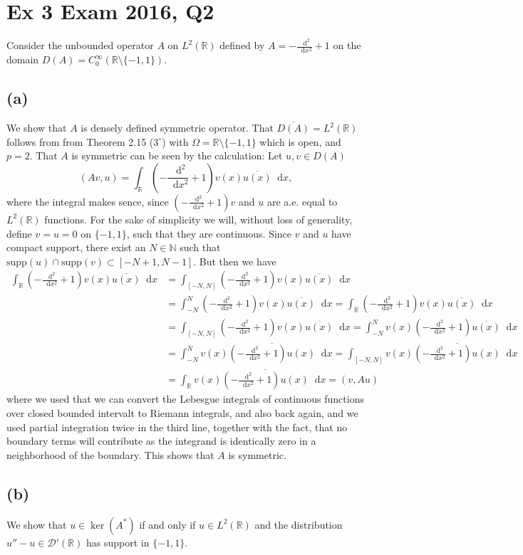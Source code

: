\documentclass[a4paper,11pt]{article}
\newcommand{\supp}{\text{supp}}
\newcommand*\diff{\mathop{}\!\mathrm{d}}
\newcommand{\R}{\mathbb{R}}
\newcommand{\N}{\mathbb{N}}
\numberwithin{equation}{section}
\begin{document}
\section*{Ex 3 Exam 2016, Q2}
Consider the unbounded operator $ A $ on $ L^2(\R) $ defined by $ A=-\frac{\diff^2}{\diff x^2}+1 $ on the domain $ D(A)=C^\infty_0(\R\setminus\{-1,1\}) $.
\subsection*{(a)} 
We show that $ A $ is densely defined symmetric operator.
That $ \overline{D(A)}=L^2(\R) $ follows from from Theorem 2.15 ($ 3^\circ $) with $ \Omega=\R\setminus\{-1,1\} $ which is open, and $ p=2 $. That $ A $ is symmetric can be seen by the calculation: Let $ u,v\in D(A) $\begin{equation}
(Av,u)=\int_{\R} \left(-\frac{\diff^2}{\diff x^2}+1\right)v(x)\overline{u(x)} \diff x,
\end{equation}
where the integral makes sence, since $ \left(-\frac{\diff^2}{\diff x^2}+1\right)v $ and $ u $ are a.e. equal to $ L^2(\R) $ functions. For the sake of simplicity we will, without loss of generality, define $ v=u=0 $ on $ \{-1,1\} $, such that they are continuous. Since $ v $ and $ u $ have compact support, there exist an $ N\in \N $ such that $ \supp(u)\cap \supp(v)\subset [-N+1,N-1] $. But then we have \begin{equation}
\begin{aligned}
\int_{\R} \left(-\frac{\diff^2}{\diff x^2}+1\right)v(x)\overline{u(x)} \diff x&=\int_{[-N,N]} \left(-\frac{\diff^2}{\diff x^2}+1\right)v(x)\overline{u(x)}\diff x\\
&=\int_{-N}^{N}\left(-\frac{\diff^2}{\diff x^2}+1\right)v(x)\overline{u(x)} \diff x = \int_{\R} \left(-\frac{\diff^2}{\diff x^2}+1\right)v(x)\overline{u(x)} \diff x\\
&=\int_{[-N,N]} \left(-\frac{\diff^2}{\diff x^2}+1\right)v(x)\overline{u(x)}\diff x=\int_{-N}^{N}v(x)\left(-\frac{\diff^2}{\diff x^2}+1\right)\overline{u(x)} \diff x\\
&=\int_{-N}^{N}v(x)\overline{\left(-\frac{\diff^2}{\diff x^2}+1\right)u(x)} \diff x=\int_{[-N,N]}v(x)\overline{\left(-\frac{\diff^2}{\diff x^2}+1\right)u(x)} \diff x\\
&=\int_{\R}v(x)\overline{\left(-\frac{\diff^2}{\diff x^2}+1\right)u(x)} \diff x=(v,Au)
\end{aligned}
\end{equation}
where we used that we can convert the Lebesgue integrals of continuous functions over closed bounded intervalt to Riemann integrals, and also back again, and we used partial integration twice in the third line, together with the fact, that no boundary terms will contribute as the integrand is identically zero in a neighborhood of the boundary. This shows that $ A $ is symmetric.

\subsection*{(b)}
We show that $ u\in\ker(A^*) $ if and only if $ u\in L^2(\R) $ and the distribution $ u''-u\in\mathcal{D}'(\R) $ has support in $ \{-1,1\} $.
\end{document}
